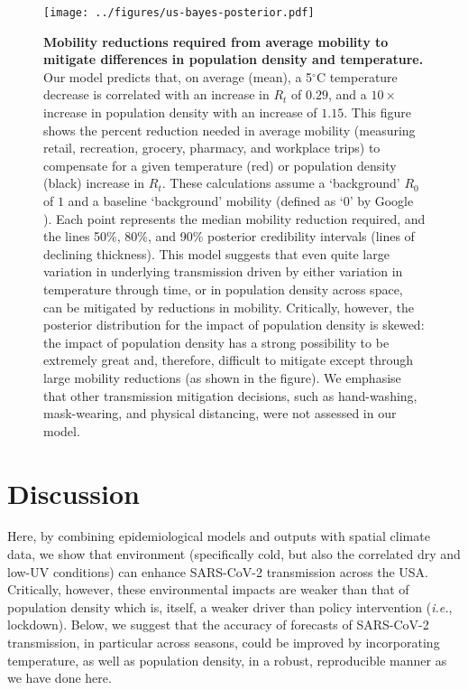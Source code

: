 \documentclass[12pt,english,a4paper]{article}
\newcommand{\virus}{SARS-CoV-2\xspace}
\newcommand{\RO}{$R_0$\xspace}
\begin{document}
\begin{figure}[ht]
  \centering
  \texttt{[image: ../figures/us-bayes-posterior.pdf]}  
\caption{\textbf{Mobility reductions required from average mobility to mitigate differences in population density and temperature.} Our model predicts that, on average (mean), a 5$^{\circ}$C temperature decrease is correlated with an increase in $R_t$ of $0.29$, and a $10\times$ increase in population density with an increase of $1.15$. This figure shows the percent reduction needed in average mobility (measuring retail, recreation, grocery, pharmacy, and workplace trips) to compensate for a given temperature (red) or population density (black) increase in $R_t$. These calculations assume a `background' \RO of $1$ and a baseline `background' mobility (defined as `0' by Google \cite{Aktay2020}). Each point represents the median mobility reduction required, and the lines 50\%, 80\%, and 90\% posterior credibility intervals (lines of declining thickness). This model suggests that even quite large variation in underlying transmission driven by either variation in temperature through time, or in population density across space, can be mitigated by reductions in mobility. Critically, however, the posterior distribution for the impact of population density is skewed: the impact of population density has a strong possibility to be extremely great and, therefore, difficult to mitigate except through large mobility reductions (as shown in the figure). We emphasise that other transmission mitigation decisions, such as hand-washing, mask-wearing, and physical distancing, were not assessed in our model.}
\label{fig:bayes}
\end{figure}


\clearpage
\section*{Discussion}

Here, by combining epidemiological models and outputs with spatial climate data, we show that environment (specifically cold, but also the correlated dry and low-UV conditions)
can enhance \virus transmission across the USA. Critically, however, these environmental impacts are weaker than that of population density which is, itself, a weaker driver than policy intervention (\emph{i.e.}, lockdown). 
Below, we suggest that the accuracy of forecasts of \virus transmission, in particular across seasons, could be improved by incorporating temperature, as well as population density, in a robust, reproducible manner as we have done here.
\end{document}

